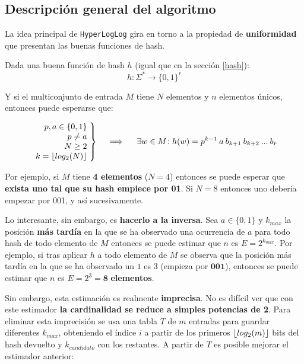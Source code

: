 \subsection{Descripción general del algoritmo}

La idea principal de \texttt{HyperLogLog} gira en torno a la propiedad de \textbf{uniformidad} que presentan las buenas
funciones de hash.

Dada una buena función de hash $h$ (igual que en la sección \ref{hash}):
$$h: \Sigma^* \rightarrow \{0,1\}^r$$

Y si el multiconjunto de entrada $M$ tiene $N$ elementos y $n$ elementos únicos, entonces puede esperarse que:

\begin{align*}
  \left.\begin{array}{r@{\mskip\thickmuskip}l}
    p, a \in \{0, 1\} \\
    p \neq a \\
    N \geq 2 \\
    k = \floor{log_2(N)}
  \end{array} \right\}
  \quad \implies \quad
  \left.
    \exists{w \in M}\!: h(w) = p^{k-1} \: a \: b_{k+1} \: b_{k+2} \: ... \: b_r
  \right.
\end{align*}

Por ejemplo, si $M$ tiene \textbf{4 elementos} ($N = 4$) entonces se puede esperar que \textbf{exista uno tal que su hash
empiece por 01}. Si $N = 8$ entonces uno debería empezar por 001, y así sucesivamente.

Lo interesante, sin embargo, es \textbf{hacerlo a la inversa}.
Sea $a \in \{0, 1\}$ y $k_{max}$ la posición \textbf{más tardía} en la que se ha observado
una ocurrencia de $a$ para todo hash de todo elemento de $M$ entonces se puede estimar que $n$ es $E = 2^{k_{max}}$.
Por ejemplo, si tras aplicar $h$ a todo elemento de $M$ se observa que la posición más tardía en la que se ha observado un
$1$ es 3 (empieza por $\textbf{001}$), entonces se puede estimar que $n$ es $E = 2^3 = \textbf{8}$ \textbf{elementos}.

Sin embargo, esta estimación es realmente \textbf{imprecisa}. No es difícil ver que con este estimador
\textbf{la cardinalidad se reduce a simples potencias de 2}. Para eliminar esta imprecisión se usa una tabla $T$ de $m$ entradas
para guardar diferentes $k_{max}$, obteniendo el índice $i$ a partir de los primeros $\lfloor log_2(m)\rfloor$ bits del hash devuelto
y $k_{candidato}$ con los restantes. A partir de $T$ es posible mejorar el estimador anterior:


